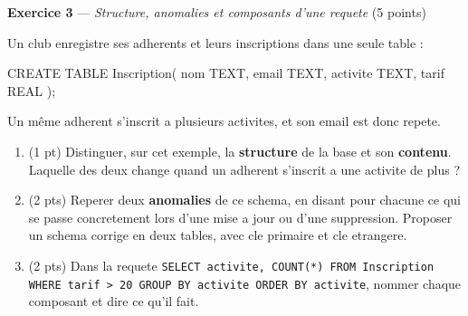 
\bigskip

\textbf{Exercice 3} --- \textit{Structure, anomalies et composants d'une requete} \hfill (5 points)

Un club enregistre ses adherents et leurs inscriptions dans une seule table :

\begin{sql}
CREATE TABLE Inscription(
  nom TEXT, email TEXT, activite TEXT, tarif REAL
);
\end{sql}
Un même adherent s'inscrit a plusieurs activites, et son email est donc repete.

\begin{enumerate}
  \item (1 pt) Distinguer, sur cet exemple, la \textbf{structure} de la base et son
  \textbf{contenu}. Laquelle des deux change quand un adherent s'inscrit a une activite de
  plus ?
  \item (2 pts) Reperer deux \textbf{anomalies} de ce schema, en disant pour chacune ce qui
  se passe concretement lors d'une mise a jour ou d'une suppression. Proposer un schema
  corrige en deux tables, avec cle primaire et cle etrangere.
  \item (2 pts) Dans la requete
  \lstinline{SELECT activite, COUNT(*) FROM Inscription WHERE tarif > 20 GROUP BY activite ORDER BY activite},
  nommer chaque composant et dire ce qu'il fait.
\end{enumerate}

